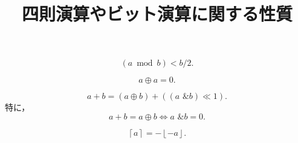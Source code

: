 \documentclass{jsarticle}
\title{四則演算やビット演算に関する性質}
\newcommand{\floor}[1]{\left\lfloor #1\right\rfloor}
\newcommand{\ceil}[1]{\left\lceil #1\right\rceil}
\newcommand{\bitand}{\text{ \& }}
\begin{document}
\maketitle


\[(a\bmod b) < b/2.\]

\[a \oplus a = 0.\]

\[a+b = (a\oplus b) + ((a\bitand b) \ll 1).\]
特に，
\[a+b=a\oplus b\iff a\bitand b=0.
\]

\[\ceil{a} = -\floor{-a}.\]
\end{document}

